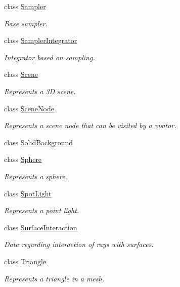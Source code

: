 \begin{DoxyCompactItemize}
class \mbox{\hyperlink{classomg_1_1_sampler}{Sampler}}
\begin{DoxyCompactList}\small\item\em Base sampler. \end{DoxyCompactList}\item 
class \mbox{\hyperlink{classomg_1_1_sampler_integrator}{Sampler\+Integrator}}
\begin{DoxyCompactList}\small\item\em \mbox{\hyperlink{classomg_1_1_integrator}{Integrator}} based on sampling. \end{DoxyCompactList}\item 
class \mbox{\hyperlink{classomg_1_1_scene}{Scene}}
\begin{DoxyCompactList}\small\item\em Represents a 3D scene. \end{DoxyCompactList}\item 
class \mbox{\hyperlink{classomg_1_1_scene_node}{Scene\+Node}}
\begin{DoxyCompactList}\small\item\em Represents a scene node that can be visited by a visitor. \end{DoxyCompactList}\item 
class \mbox{\hyperlink{classomg_1_1_solid_background}{Solid\+Background}}
\item 
class \mbox{\hyperlink{classomg_1_1_sphere}{Sphere}}
\begin{DoxyCompactList}\small\item\em Represents a sphere. \end{DoxyCompactList}\item 
class \mbox{\hyperlink{classomg_1_1_spot_light}{Spot\+Light}}
\begin{DoxyCompactList}\small\item\em Represents a point light. \end{DoxyCompactList}\item 
class \mbox{\hyperlink{classomg_1_1_surface_interaction}{Surface\+Interaction}}
\begin{DoxyCompactList}\small\item\em Data regarding interaction of rays with surfaces. \end{DoxyCompactList}\item 
class \mbox{\hyperlink{classomg_1_1_triangle}{Triangle}}
\begin{DoxyCompactList}\small\item\em Represents a triangle in a mesh. \end{DoxyCompactList}\item 

\end{DoxyCompactItemize}
